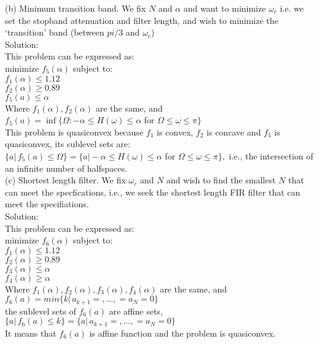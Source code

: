 \documentclass{article}
\begin{document}
(b) Minimum transition band. We fix $N$ and $\alpha$ 
and want to minimize $\omega_c$ i.e. we set the stopband
attenuation and filter length, and wish to minimize the `transition' band (between $pi/3$ and $\omega_c$)\\

Solution:\\
This problem can be expressed as:\\
minimize $f_5(\alpha)$
subject to:\\
$f_1(\alpha) \leq 1.12$ \\
$f_2(\alpha) \geq 0.89$ \\
$f_5(a) \leq \alpha$ \\
Where $f_1(\alpha), f_2(\alpha)$ are the same, and \\
$f_5(a) = \inf \{\Omega: 
-\alpha \leq H(\omega) \leq \alpha $ for 
$ \Omega \leq \omega \leq \pi \}$ \\

This problem is quasiconvex because $f_1$ is convex, 
$f_2$ is concave and $f_5$ is quasiconvex, its sublevel sets are:\\
$\{a| \, f_5(a) \leq \Omega\} = 
\{a| -\alpha \leq H(\omega) \leq \alpha $ for 
$ \Omega \leq \omega \leq \pi \},$ i.e., the intersection of an infinite number of halfspaces. \\

(c) Shortest length filter. We fix $\omega_c$ and $N$ and wish to find the smallest $N$ that can meet the
specfications, i.e., we seek the shortest length FIR filter that can meet the specifiations. \\

Solution:\\
This problem can be expressed as:\\
minimize $f_6(\alpha)$
subject to:\\
$f_1(\alpha) \leq 1.12$ \\
$f_2(\alpha) \geq 0.89$ \\
$f_3(\alpha) \leq \alpha$ \\
$f_4(\alpha) \geq \alpha$ \\
Where $f_1(\alpha), f_2(\alpha), f_3(\alpha), f_4(\alpha)$ are the same, and \\
$f_6(a) = min\{k| \, a_{k+1} = , ... ,  = a_N = 0\}$\\
the sublevel sets of $f_6(a)$ are affine sets, \\
$\{a| \, f_6(a) \leq k\} = 
\{a| \, a_{k+1} = , ... ,  = a_N = 0\}$ \\
It means that $f_6(a)$ is affine function and the problem is quasiconvex.
\end{document}
